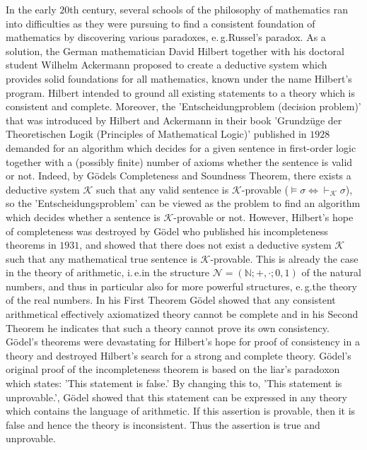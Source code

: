 In the early $20$th century, several schools of the philosophy of mathematics ran into difficulties as they were pursuing to find a consistent foundation of mathematics by discovering various paradoxes, e.\,g.\@ Russel's paradox. As a solution, the German mathematician David Hilbert together with his doctoral student Wilhelm Ackermann proposed to create a deductive system which provides solid foundations for all mathematics, known under the name Hilbert's program. Hilbert intended to ground all existing statements to a theory which is consistent and complete. Moreover, the 'Entscheidungproblem (decision problem)' that was introduced by Hilbert and Ackermann in their book 'Grundzüge der Theoretischen Logik (Principles of Mathematical Logic)' \cite{Hilbert1972} published in $1928$ demanded for an algorithm which decides for a given sentence in first-order logic together with a (possibly finite) number of axioms whether the sentence is valid or not. Indeed, by G\"odels Completeness and Soundness Theorem, there exists a deductive system $\mathcal{K}$ such that any valid sentence is $\mathcal{K}$-provable ($\vDash \sigma \Leftrightarrow \vdash_\mathcal{K} \sigma$), so the 'Entscheidungsproblem' can be viewed as the problem to find an algorithm which decides whether a sentence is $\mathcal{K}$-provable or not. However, Hilbert's hope of completeness was destroyed by Gödel who published his incompleteness theorems in $1931$, and showed that there does not exist a deductive system $\mathcal{K}$ such that any mathematical true sentence is $\mathcal{K}$-provable. This is already the case in the theory of arithmetic, i.\,e.\@ in the structure $\mathcal{N} = (\mathbb{N};+,\cdot; 0,1)$ of the natural numbers, and thus in particular also for more powerful structures, e.\,g.\@ the theory of the real numbers. In his First Theorem Gödel showed that any consistent arithmetical effectively axiomatized theory cannot be complete and in his Second Theorem he indicates that such a theory cannot prove its own consistency. Gödel's theorems were devastating for Hilbert's hope for proof of consistency in a theory and destroyed Hilbert's search for a strong and complete theory. G\"odel's original proof of the incompleteness theorem is based on the liar's paradoxon which states: 'This statement is false.' By changing this to, 'This statement is unprovable.', G\"odel showed that this statement can be expressed in any theory which contains the language of arithmetic. If this assertion is provable, then it is false and hence the theory is inconsistent. Thus the assertion is true and unprovable. 

